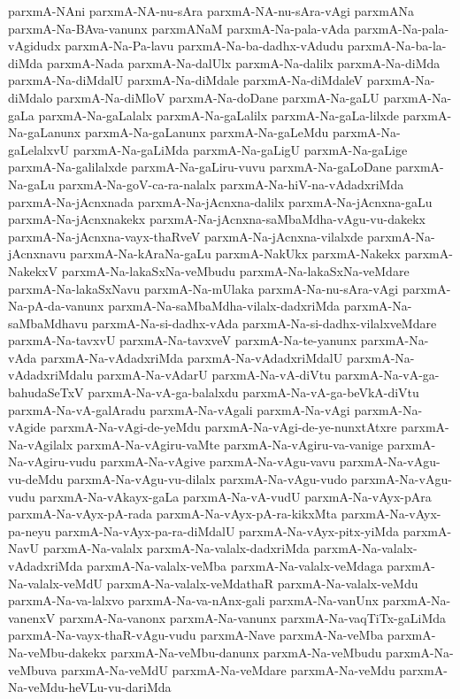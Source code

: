 {parxmA-NAni
parxmA-NA-nu-sAra
parxmA-NA-nu-sAra-vAgi
parxmANa
parxmA-Na-BAva-vanunx
parxmANaM
parxmA-Na-pala-vAda
parxmA-Na-pala-vAgidudx
parxmA-Na-Pa-lavu
parxmA-Na-ba-dadhx-vAdudu
parxmA-Na-ba-la-diMda
parxmA-Nada
parxmA-Na-dalUlx
parxmA-Na-dalilx
parxmA-Na-diMda
parxmA-Na-diMdalU
parxmA-Na-diMdale
parxmA-Na-diMdaleV
parxmA-Na-diMdalo
parxmA-Na-diMloV
parxmA-Na-doDane
parxmA-Na-gaLU
parxmA-Na-gaLa
parxmA-Na-gaLalalx
parxmA-Na-gaLalilx
parxmA-Na-gaLa-lilxde
parxmA-Na-gaLanunx
parxmA-Na-gaLanunx
parxmA-Na-gaLeMdu
parxmA-Na-gaLelalxvU
parxmA-Na-gaLiMda
parxmA-Na-gaLigU
parxmA-Na-gaLige
parxmA-Na-galilalxde
parxmA-Na-gaLiru-vuvu
parxmA-Na-gaLoDane
parxmA-Na-gaLu
parxmA-Na-goV-ca-ra-nalalx
parxmA-Na-hiV-na-vAdadxriMda
parxmA-Na-jAcnxnada
parxmA-Na-jAcnxna-dalilx
parxmA-Na-jAcnxna-gaLu
parxmA-Na-jAcnxnakekx
parxmA-Na-jAcnxna-saMbaMdha-vAgu-vu-dakekx
parxmA-Na-jAcnxna-vayx-thaRveV
parxmA-Na-jAcnxna-vilalxde
parxmA-Na-jAcnxnavu
parxmA-Na-kAraNa-gaLu
parxmA-NakUkx
parxmA-Nakekx
parxmA-NakekxV
parxmA-Na-lakaSxNa-veMbudu
parxmA-Na-lakaSxNa-veMdare
parxmA-Na-lakaSxNavu
parxmA-Na-mUlaka
parxmA-Na-nu-sAra-vAgi
parxmA-Na-pA-da-vanunx
parxmA-Na-saMbaMdha-vilalx-dadxriMda
parxmA-Na-saMbaMdhavu
parxmA-Na-si-dadhx-vAda
parxmA-Na-si-dadhx-vilalxveMdare
parxmA-Na-tavxvU
parxmA-Na-tavxveV
parxmA-Na-te-yanunx
parxmA-Na-vAda
parxmA-Na-vAdadxriMda
parxmA-Na-vAdadxriMdalU
parxmA-Na-vAdadxriMdalu
parxmA-Na-vAdarU
parxmA-Na-vA-diVtu
parxmA-Na-vA-ga-bahudaSeTxV
parxmA-Na-vA-ga-balalxdu
parxmA-Na-vA-ga-beVkA-diVtu
parxmA-Na-vA-galAradu
parxmA-Na-vAgali
parxmA-Na-vAgi
parxmA-Na-vAgide
parxmA-Na-vAgi-de-yeMdu
parxmA-Na-vAgi-de-ye-nunxtAtxre
parxmA-Na-vAgilalx
parxmA-Na-vAgiru-vaMte
parxmA-Na-vAgiru-va-vanige
parxmA-Na-vAgiru-vudu
parxmA-Na-vAgive
parxmA-Na-vAgu-vavu
parxmA-Na-vAgu-vu-deMdu
parxmA-Na-vAgu-vu-dilalx
parxmA-Na-vAgu-vudo
parxmA-Na-vAgu-vudu
parxmA-Na-vAkayx-gaLa
parxmA-Na-vA-vudU
parxmA-Na-vAyx-pAra
parxmA-Na-vAyx-pA-rada
parxmA-Na-vAyx-pA-ra-kikxMta
parxmA-Na-vAyx-pa-neyu
parxmA-Na-vAyx-pa-ra-diMdalU
parxmA-Na-vAyx-pitx-yiMda
parxmA-NavU
parxmA-Na-valalx
parxmA-Na-valalx-dadxriMda
parxmA-Na-valalx-vAdadxriMda
parxmA-Na-valalx-veMba
parxmA-Na-valalx-veMdaga
parxmA-Na-valalx-veMdU
parxmA-Na-valalx-veMdathaR
parxmA-Na-valalx-veMdu
parxmA-Na-va-lalxvo
parxmA-Na-va-nAnx-gali
parxmA-Na-vanUnx
parxmA-Na-vanenxV
parxmA-Na-vanonx
parxmA-Na-vanunx
parxmA-Na-vaqTiTx-gaLiMda
parxmA-Na-vayx-thaR-vAgu-vudu
parxmA-Nave
parxmA-Na-veMba
parxmA-Na-veMbu-dakekx
parxmA-Na-veMbu-danunx
parxmA-Na-veMbudu
parxmA-Na-veMbuva
parxmA-Na-veMdU
parxmA-Na-veMdare
parxmA-Na-veMdu
parxmA-Na-veMdu-heVLu-vu-dariMda
}
